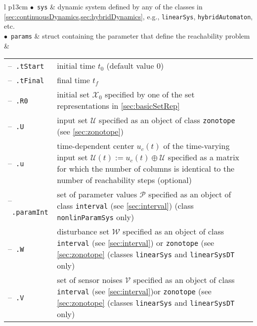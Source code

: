\begin{center}
\renewcommand{\arraystretch}{1.3}
\begin{tabular}[t]{l p{13cm} }
	$\bullet$~\texttt{sys} & dynamic system defined by any of the classes in \cref{sec:continuousDynamics,sec:hybridDynamics}, e.g., \texttt{linearSys}, \texttt{hybridAutomaton}, etc. \\
	$\bullet$~\texttt{params} & struct containing the parameter that define the reachability problem \\
	& \begin{tabular}[t]{l p{10cm}}	
	 	--~\texttt{.tStart} & initial time $t_0$ (default value 0) \\
	 	--~\texttt{.tFinal} & final time $t_f$ \\
	 	--~\texttt{.R0} & initial set $\mathcal{X}_0$ specified by one of the set representations in \cref{sec:basicSetRep}\\
	 	--~\texttt{.U} & input set $\mathcal{U}$ specified as an object of class \texttt{zonotope} (see \cref{sec:zonotope})\\
	 	--~\texttt{.u} & time-dependent center $u_c(t)$ of the time-varying input set $\mathcal{U}(t) := u_c(t) \oplus \mathcal{U}$ specified as a matrix for which the number of columns is identical to the number of reachability steps (optional)\\
	 	--~\texttt{.paramInt} & set of parameter values $\mathcal{P}$ specified as an object of class \texttt{interval} (see \cref{sec:interval}) (class \texttt{nonlinParamSys} only)\\
	 	--~\texttt{.W} & disturbance set $\mathcal{W}$ specified as an object of class \texttt{interval} (see \cref{sec:interval}) or \texttt{zonotope} (see \cref{sec:zonotope} (classes \texttt{linearSys} and \texttt{linearSysDT} only) \\
	 	--~\texttt{.V} & set of sensor noises $\mathcal{V}$ specified as an object of class \texttt{interval} (see \cref{sec:interval})or \texttt{zonotope} (see \cref{sec:zonotope} (classes \texttt{linearSys} and \texttt{linearSysDT} only) \\
	 \end{tabular}
\end{tabular}
\end{center}

